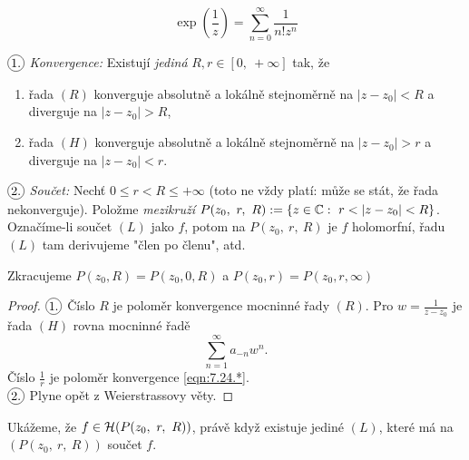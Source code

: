 \begin{example}
$$\exp\left(\frac{1}{z}\right)=\sum_{n=0}^\infty\frac{1}{n!z^n}$$
\end{example}
\begin{properties}[L]
$\circled{1.}$ \emph{Konvergence:} Existují \emph{jediná} $R,r\in[0,\ +\infty]$ tak, že 
\begin{enumerate}
    \item
        řada $(R)$ konverguje absolutně a lokálně stejnoměrně na $|z-z_0|<R$ a diverguje na $|z-z_0|>R$, 
    \item
        řada $(H)$ konverguje absolutně a lokálně stejnoměrně na $|z-z_0|>r$ a diverguje na $|z-z_0|<r$.
\end{enumerate}

$\circled{2.}$ \emph{Součet:} Nechť $0\leq r<R\leq+\infty$ (toto ne vždy platí: může se stát, že řada nekonverguje). Položme \emph{mezikruží} $P(z_0,\ r,\ R) :=\{z\in\Comp:\ r<|z-z_0|<R\}$. Označíme-li součet $(L)$ jako $f$, potom na $P(z_0,\ r,\ R)$ je $f$ holomorfní, řadu $(L)$ tam derivujeme "člen po členu", atd.
\end{properties}

\begin{note} Zkracujeme
$P(z_0,R)=P(z_0,0,R)$ a $P(z_0,r)=P(z_0,r,\infty)$
\end{note}

\begin{proof}
$\circled{1.}$ Číslo $R$ je poloměr konvergence mocninné řady $(R)$. Pro $w=\frac{1}{z-z_0}$ je řada $(H)$ rovna mocninné řadě 
\begin{equation}
    \sum_{n=1}^\infty a_{-n}w^n.
    \tag{*}
    \label{eqn:7.24.*}
\end{equation} Číslo $\frac{1}{r}$ je poloměr konvergence \cref{eqn:7.24.*}.\\
$\circled{2.}$ Plyne opět z Weierstrassovy věty.
\end{proof}

 Ukážeme, že $f\in\Holo(P(z_0,\ r,\ R))$, právě když existuje jediné $(L)$, které má na $(P(z_0,\ r,\ R))$ součet $f$.
